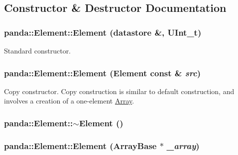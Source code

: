 \subsection{Constructor \& Destructor Documentation}
\hypertarget{classpanda_1_1Element_a3609b8601b13eab58a55ca795ee0d6a9}{
\subsubsection[{Element}]{\setlength{\rightskip}{0pt plus 5cm}panda::Element::Element ({\bf datastore} \&, \/  UInt\_\-t)}}
\label{classpanda_1_1Element_a3609b8601b13eab58a55ca795ee0d6a9}


Standard constructor. \hypertarget{classpanda_1_1Element_a05d5ba2bfa48de80d981542bfec8ce53}{
\subsubsection[{Element}]{\setlength{\rightskip}{0pt plus 5cm}panda::Element::Element ({\bf Element} const \& {\em src})}}
\label{classpanda_1_1Element_a05d5ba2bfa48de80d981542bfec8ce53}


Copy constructor. Copy construction is similar to default construction, and involves a creation of a one-\/element \hyperlink{classpanda_1_1Array}{Array}. \hypertarget{classpanda_1_1Element_aa2ba932e80290d7449e03f6345960631}{
\subsubsection[{$\sim$Element}]{\setlength{\rightskip}{0pt plus 5cm}panda::Element::$\sim$Element ()}}
\label{classpanda_1_1Element_aa2ba932e80290d7449e03f6345960631}
\hypertarget{classpanda_1_1Element_a0500449175b8f307838ecf826cd02555}{
\subsubsection[{Element}]{\setlength{\rightskip}{0pt plus 5cm}panda::Element::Element ({\bf ArrayBase} $\ast$ {\em \_\-array})}}
\label{classpanda_1_1Element_a0500449175b8f307838ecf826cd02555}


